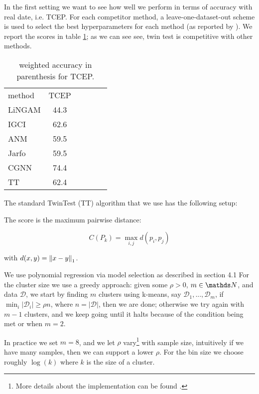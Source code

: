 In the first setting we want to see how well we perform in terms of accuracy with real date, i.e.
TCEP. For each  competitor method, a leave-one-dataset-out scheme 
is used to select the best hyperparameters for each method (as reported by \cite{goudet2017causal}). 
We report the scores in table \ref{tab:acc}; as we can see see, twin test is competitive with 
other methods.


\vspace{0.03\textheight}
\begin{table}[H]
    \centering
    \begin{tabular}{lccccc}
        \hline method  & TCEP \\
        LiNGAM &   44.3 \\
        IGCI  &  62.6 \\
        ANM  &  59.5 \\
        Jarfo  &  59.5 \\
        CGNN   &  74.4 \\
        \hline TT & 62.4 \\
        \hline
    \end{tabular}

    \caption{ weighted accuracy 
     in parenthesis for TCEP.}   
    \label{tab:acc}
\end{table}


The standard TwinTest (TT) algorithm that we use has the following setup:

The score is the maximum pairwise distance:

$$
    C(P_k) = \operatorname{max}_{i, j} d(p_i, p_j)
$$

with $d(x, y) = \left\lVert x - y\right\rVert_1$.

We use polynomial regression via model selection as described in section 4.1 For the cluster size
we use a greedy approach: given some $\rho > 0$, $m \in \N$, and data $\mathcal{D}$, 
we start by finding $m$ clusters
using k-means, say $\mathcal{D}_1, ..., \mathcal{D}_m$, if 
$\min_i |\mathcal{D}_i| \geq \rho n$, where $n = |\mathcal{D}|$, then we are done; 
otherwise we try again with $m - 1$ clusters, and we keep going until it halts because of the 
condition being met or when $m = 2$. 

In practice we set $m = 8$, and we let $\rho$ vary\footnote{More details about the implementation can be found 
\href{https://github.com/Nacho114/bivariate-causal-inference}{\color{blue}{here}}.} 
with sample size, intuitively if we have many samples, then we can support a lower $\rho$.
For the bin size we choose roughly $\log(k)$ where $k$ is the size of a cluster.

